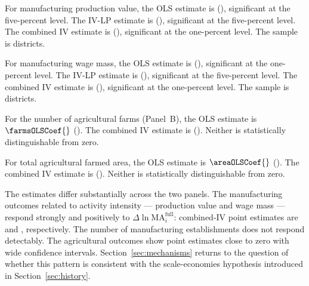 For manufacturing production value, the OLS estimate is \valprodOLSCoef{}
(\valprodOLSSE{}), significant at the five-percent level. The IV-LP estimate is
\valprodIVLPCoef{} (\valprodIVLPSE{}), significant at the
five-percent level. The combined IV estimate is \mfgValprodCoefIVBoth{}
(\mfgValprodSEIVBoth{}),
significant at the one-percent level. The sample is \valprodN{} districts.

For manufacturing wage mass, the OLS estimate is \massalOLSCoef{} (\massalOLSSE{}),
significant at the one-percent level. The IV-LP estimate is \massalIVLPCoef{}
(\massalIVLPSE{}), significant at the five-percent level. The combined IV
estimate is \mfgWageMassCoefIVBoth{} (\mfgWageMassSEIVBoth{}),
significant at the one-percent level.
The sample is \massalN{} districts.

For the number of agricultural farms (Panel~B), the OLS estimate is
$\farmsOLSCoef{}$ (\farmsOLSSE{}). The combined IV estimate is \farmsIVBCoef{} (\farmsIVBSE{}).
Neither is statistically distinguishable from zero.

For total agricultural farmed area, the OLS estimate is $\areaOLSCoef{}$
(\areaOLSSE{}). The combined IV estimate is \areaIVBCoef{} (\areaIVBSE{}). Neither is
statistically distinguishable from zero.

The estimates differ substantially across the two panels. The
manufacturing outcomes related to activity intensity --- production
value and wage mass --- respond strongly and positively to
$\Delta \ln \mathrm{MA}^{\mathrm{full}}_i$: combined-IV point estimates
are \mfgValprodCoefIVBoth{} and \mfgWageMassCoefIVBoth{}, respectively. The number of manufacturing
establishments does not respond detectably. The agricultural
outcomes show point estimates close to zero with wide confidence
intervals. Section~\ref{sec:mechanisms} returns to the question of
whether this pattern is consistent with the scale-economies
hypothesis introduced in Section~\ref{sec:history}.

